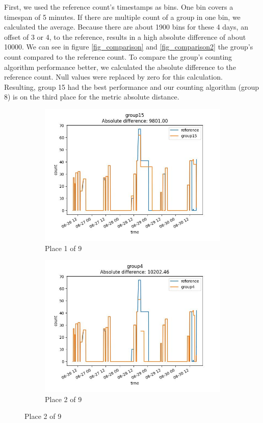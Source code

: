 First, we used the reference count's timestamps as bins. One bin covers a timespan of 5 minutes.
If there are multiple count of a group in one bin, we calculated the average.
Because there are about 1900 bins for these 4 days, an offset of 3 or 4, to the reference, results in a high absolute
difference of about 10000.
We can see in figure \ref{fig_comparison} and \ref{fig_comparison2} the group's count compared to the reference count.
To compare the group's counting algorithm performance better, we calculated the absolute
difference to the reference count. Null values were replaced by zero for this calculation.\\
Resulting, group 15 had the best performance and our counting algorithm (group 8) is on the
third place for the metric absolute distance.

\begin{figure}
    \centering
    \begin{subfigure}[b]{0.45\textwidth}
        \includegraphics[width=\linewidth]{figures/ref-group15.jpeg}
        \caption{Place 1 of 9}
    \end{subfigure}
    \begin{subfigure}[b]{0.45\textwidth}
        \includegraphics[width=\linewidth]{figures/ref-group4.jpeg}
        \caption{Place 2 of 9}
    \end{subfigure}


\end{figure}
